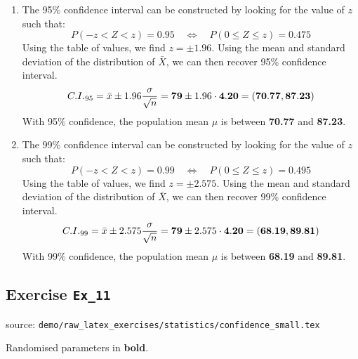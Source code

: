 \documentclass[a4paper, leqno, 12pt]{report}
\newenvironment{top_enumerate}{
\begin{enumerate}
  \setlength{\itemsep}{2em}
  \setlength{\topsep}{-0pt}
  \setlength{\partopsep}{-0pt}
}{\end{enumerate}}
\begin{document}
\begin{top_enumerate}
\begin{enumerate}
	The 90\% confidence interval can be constructed using the standard normal distribution, but looking for the value of $z$ such that:
	\[
	P(-z < Z < z) = 0.9 \quad \iff \quad P(0 \le Z \le z) = 0.45
	\]
	Using the table of values, we find $z = \pm 1.645$. Using the mean and standard deviation of the distribution of $\bar X$, we can then recover 90\% confidence interval.
	\[
	C.I._{90} = \bar x \pm 1.645 \frac{\sigma}{\sqrt{n}} = {\bf 79} \pm 1.645 \cdot {\bf 4.20} = ({\bf 72.09}, {\bf 85.91})
	\]
	With 90\% confidence, the population mean $\mu$ is between {\bf 72.09} and {\bf 85.91}.
	 \quad \textbf{}
		\item The 95\% confidence interval can be constructed by looking for the value of $z$ such that:
	\[
	P(-z < Z < z) = 0.95 \quad \iff \quad P(0 \le Z \le z) = 0.475
	\]
	Using the table of values, we find $z = \pm 1.96$. Using the mean and standard deviation of the distribution of $\bar X$, we can then recover 95\% confidence interval.
	\[
	C.I._{95} = \bar x \pm 1.96 \frac{\sigma}{\sqrt{n}} = {\bf 79} \pm 1.96 \cdot {\bf 4.20} = ({\bf 70.77}, {\bf 87.23})
	\]
	With 95\% confidence, the population mean $\mu$ is between {\bf 70.77} and {\bf 87.23}.
	 \quad \textbf{}
		\item The 99\% confidence interval can be constructed by looking for the value of $z$ such that:
	\[
	P(-z < Z < z) = 0.99 \quad \iff \quad P(0 \le Z \le z) = 0.495
	\]
	Using the table of values, we find $z = \pm 2.575$. Using the mean and standard deviation of the distribution of $\bar X$, we can then recover 99\% confidence interval.
	\[
	C.I._{99} = \bar x \pm 2.575 \frac{\sigma}{\sqrt{n}} = {\bf 79} \pm 2.575 \cdot {\bf 4.20} = ({\bf 68.19}, {\bf 89.81})
	\]
	With 99\% confidence, the population mean $\mu$ is between {\bf 68.19} and {\bf 89.81}.
	 \quad \textbf{}
\end{enumerate}\newpage
\end{top_enumerate}
\subsection{Exercise \texttt{Ex\_11}}
source: \texttt{demo/raw\_latex\_exercises/statistics/confidence\_small.tex}

Randomised parameters in \textbf{bold}. 
\end{document}
